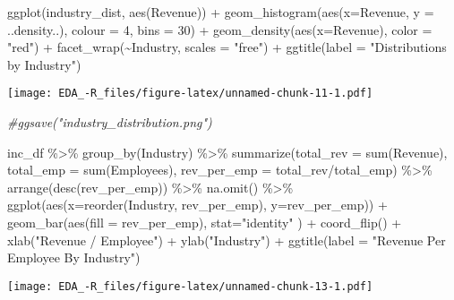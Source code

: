 \documentclass[
]{article}
\newenvironment{Shaded}{\begin{snugshade}}{\end{snugshade}}
\newcommand{\AttributeTok}[1]{\textcolor[rgb]{0.77,0.63,0.00}{#1}}
\newcommand{\CommentTok}[1]{\textcolor[rgb]{0.56,0.35,0.01}{\textit{#1}}}
\newcommand{\DecValTok}[1]{\textcolor[rgb]{0.00,0.00,0.81}{#1}}
\newcommand{\FunctionTok}[1]{\textcolor[rgb]{0.00,0.00,0.00}{#1}}
\newcommand{\NormalTok}[1]{#1}
\newcommand{\SpecialCharTok}[1]{\textcolor[rgb]{0.00,0.00,0.00}{#1}}
\newcommand{\StringTok}[1]{\textcolor[rgb]{0.31,0.60,0.02}{#1}}
\begin{document}
\begin{Shaded}
\begin{Highlighting}[]
\FunctionTok{ggplot}\NormalTok{(industry\_dist, }\FunctionTok{aes}\NormalTok{(Revenue)) }\SpecialCharTok{+} 
  \FunctionTok{geom\_histogram}\NormalTok{(}\FunctionTok{aes}\NormalTok{(}\AttributeTok{x=}\NormalTok{Revenue, }\AttributeTok{y =}\NormalTok{ ..density..), }
                 \AttributeTok{colour =} \DecValTok{4}\NormalTok{, }\AttributeTok{bins =} \DecValTok{30}\NormalTok{) }\SpecialCharTok{+}
  \FunctionTok{geom\_density}\NormalTok{(}\FunctionTok{aes}\NormalTok{(}\AttributeTok{x=}\NormalTok{Revenue), }\AttributeTok{color =} \StringTok{"red"}\NormalTok{) }\SpecialCharTok{+}
  \FunctionTok{facet\_wrap}\NormalTok{(}\SpecialCharTok{\textasciitilde{}}\NormalTok{Industry, }\AttributeTok{scales =} \StringTok{"free"}\NormalTok{) }\SpecialCharTok{+} 
  \FunctionTok{ggtitle}\NormalTok{(}\AttributeTok{label =} \StringTok{"Distributions by Industry"}\NormalTok{)}
\end{Highlighting}
\end{Shaded}

\texttt{[image: EDA\_-R\_files/figure-latex/unnamed-chunk-11-1.pdf]}

\begin{Shaded}
\begin{Highlighting}[]
\CommentTok{\#ggsave("industry\_distribution.png")}
\end{Highlighting}
\end{Shaded}

\begin{Shaded}
\begin{Highlighting}[]
\NormalTok{inc\_df }\SpecialCharTok{\%\textgreater{}\%}
  \FunctionTok{group\_by}\NormalTok{(Industry) }\SpecialCharTok{\%\textgreater{}\%}
  \FunctionTok{summarize}\NormalTok{(}\AttributeTok{total\_rev =} \FunctionTok{sum}\NormalTok{(Revenue), }
            \AttributeTok{total\_emp =} \FunctionTok{sum}\NormalTok{(Employees), }
            \AttributeTok{rev\_per\_emp =}\NormalTok{ total\_rev}\SpecialCharTok{/}\NormalTok{total\_emp) }\SpecialCharTok{\%\textgreater{}\%}
  \FunctionTok{arrange}\NormalTok{(}\FunctionTok{desc}\NormalTok{(rev\_per\_emp)) }\SpecialCharTok{\%\textgreater{}\%}
  \FunctionTok{na.omit}\NormalTok{() }\SpecialCharTok{\%\textgreater{}\%}
  \FunctionTok{ggplot}\NormalTok{(}\FunctionTok{aes}\NormalTok{(}\AttributeTok{x=}\FunctionTok{reorder}\NormalTok{(Industry, rev\_per\_emp), }\AttributeTok{y=}\NormalTok{rev\_per\_emp)) }\SpecialCharTok{+}
  \FunctionTok{geom\_bar}\NormalTok{(}\FunctionTok{aes}\NormalTok{(}\AttributeTok{fill =}\NormalTok{ rev\_per\_emp), }\AttributeTok{stat=}\StringTok{"identity"}\NormalTok{ ) }\SpecialCharTok{+}
  \FunctionTok{coord\_flip}\NormalTok{() }\SpecialCharTok{+} 
  \FunctionTok{xlab}\NormalTok{(}\StringTok{"Revenue / Employee"}\NormalTok{) }\SpecialCharTok{+} 
  \FunctionTok{ylab}\NormalTok{(}\StringTok{"Industry"}\NormalTok{) }\SpecialCharTok{+} 
  \FunctionTok{ggtitle}\NormalTok{(}\AttributeTok{label =} \StringTok{"Revenue Per Employee By Industry"}\NormalTok{)}
\end{Highlighting}
\end{Shaded}

\texttt{[image: EDA\_-R\_files/figure-latex/unnamed-chunk-13-1.pdf]}
\end{document}
